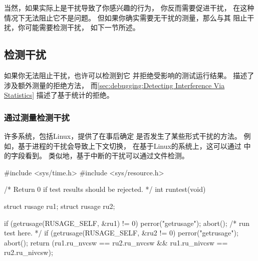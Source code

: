\QuickQuizEnd

当然，如果实际上是干扰导致了你感兴趣的行为，
你反而需要促进干扰，
在这种情况下无法阻止它不是问题。
但如果你确实需要无干扰的测量，那么与其
阻止干扰，你可能需要检测干扰，
如下一节所述。

\subsection{检测干扰}
\label{sec:debugging:Detecting Interference}

如果你无法阻止干扰，也许可以检测到它
并拒绝受影响的测试运行结果。
描述了涉及额外测量的拒绝方法，
而\cref{sec:debugging:Detecting Interference Via Statistics}
描述了基于统计的拒绝。

\subsubsection{通过测量检测干扰}
\label{sec:debugging:Detecting Interference Via Measurement}


许多系统，包括Linux，提供了在事后确定
是否发生了某些形式干扰的方法。
例如，基于进程的干扰会导致上下文切换，
在基于Linux的系统上，这可以通过
中的字段看到。
类似地，基于中断的干扰可以通过文件检测。

\begin{listing}
\begin{fcvlabel}
\begin{VerbatimL}
#include <sys/time.h>
#include <sys/resource.h>

/* Return 0 if test results should be rejected. */
int runtest(void)
{
	struct rusage ru1;
	struct rusage ru2;

	if (getrusage(RUSAGE_SELF, &ru1) != 0) {
		perror("getrusage");
		abort();
	}
	/* run test here. */
	if (getrusage(RUSAGE_SELF, &ru2 != 0) {
		perror("getrusage");
		abort();
	}
	return (ru1.ru_nvcsw == ru2.ru_nvcsw &&
	        ru1.ru_nivcsw == ru2.ru_nivcsw);
}
\end{VerbatimL}
\end{fcvlabel}
\caption{使用检测上下文切换}
\label{lst:debugging:Using getrusage() to Detect Context Switches}
\end{listing}

